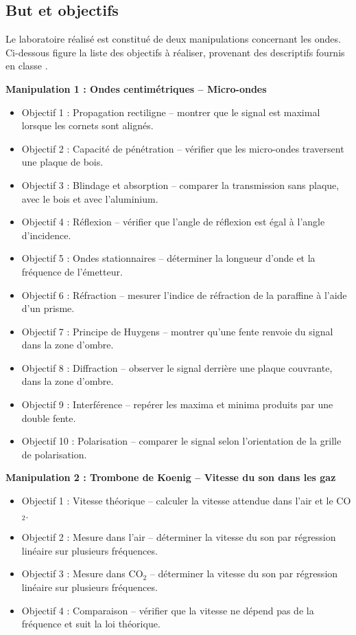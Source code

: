 \subsection{But et objectifs}

Le laboratoire réalisé est constitué de deux manipulations concernant les ondes. Ci-dessous
figure la liste des objectifs à réaliser, provenant des descriptifs fournis en classe  .

\textbf{Manipulation 1 : Ondes centimétriques -- Micro-ondes}

\begin{itemize}
  \item Objectif 1 : Propagation rectiligne -- montrer que le signal est maximal lorsque les cornets sont alignés.
  \item Objectif 2 : Capacité de pénétration -- vérifier que les micro-ondes traversent une plaque de bois.
  \item Objectif 3 : Blindage et absorption -- comparer la transmission sans plaque, avec le bois et avec l'aluminium.
  \item Objectif 4 : Réflexion -- vérifier que l'angle de réflexion est égal à l'angle d'incidence.
  \item Objectif 5 : Ondes stationnaires -- déterminer la longueur d'onde et la fréquence de l'émetteur.
  \newpage
  \item Objectif 6 : Réfraction -- mesurer l'indice de réfraction de la paraffine à l'aide d'un prisme.
  \item Objectif 7 : Principe de Huygens -- montrer qu'une fente renvoie du signal dans la zone d'ombre.
  \item Objectif 8 : Diffraction -- observer le signal derrière une plaque couvrante, dans la zone d'ombre.
  \item Objectif 9 : Interférence -- repérer les maxima et minima produits par une double fente.
  \item Objectif 10 : Polarisation -- comparer le signal selon l'orientation de la grille de polarisation.
\end{itemize}

\textbf{Manipulation 2 : Trombone de Koenig -- Vitesse du son dans les gaz}

\begin{itemize}
  \item Objectif 1 : Vitesse théorique -- calculer la vitesse attendue dans l'air et le CO$_2$.
  \item Objectif 2 : Mesure dans l'air -- déterminer la vitesse du son par régression linéaire sur plusieurs fréquences.
  \item Objectif 3 : Mesure dans CO$_2$ -- déterminer la vitesse du son par régression linéaire sur plusieurs fréquences.
  \item Objectif 4 : Comparaison -- vérifier que la vitesse ne dépend pas de la fréquence et suit la loi théorique.
\end{itemize}
